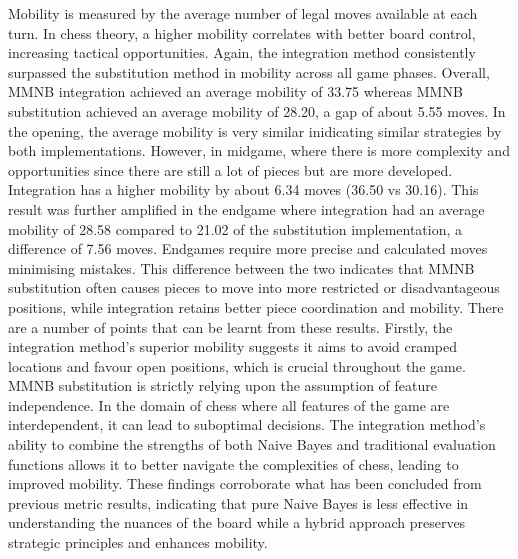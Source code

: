 

Mobility is measured by the average number of legal moves available at each turn. In chess theory, a higher mobility correlates with better board control, increasing tactical opportunities. Again, the integration method consistently surpassed the substitution method in mobility across all game phases. 
Overall, MMNB integration achieved an average mobility of 33.75 whereas MMNB substitution achieved an average mobility of 28.20, a gap of about 5.55 moves. In the opening, the average mobility is very similar inidicating similar strategies by both implementations. However, in midgame, where there is more complexity and opportunities since there are still a lot of pieces but are more developed. Integration has a higher mobility by about 6.34 moves (36.50 vs 30.16). This result was further amplified in the endgame where integration had an average mobility of 28.58 compared to 21.02 of the substitution implementation, a difference of 7.56 moves. Endgames require more precise and calculated moves minimising mistakes. This difference between the two indicates that MMNB substitution often causes pieces to move into more restricted or disadvantageous positions, while integration retains better piece coordination and mobility. There are a number of points that can be learnt from these results. Firstly, the integration method's superior mobility suggests it aims to avoid cramped locations and favour open positions, which is crucial throughout the game. MMNB substitution is strictly relying upon the assumption of feature independence. In the domain of chess where all features of the game are interdependent, it can lead to suboptimal decisions. The integration method's ability to combine the strengths of both Naive Bayes and traditional evaluation functions allows it to better navigate the complexities of chess, leading to improved mobility. These findings corroborate what has been concluded from previous metric results, indicating that pure Naive Bayes is less effective in understanding the nuances of the board while a hybrid approach preserves strategic principles and enhances mobility.

